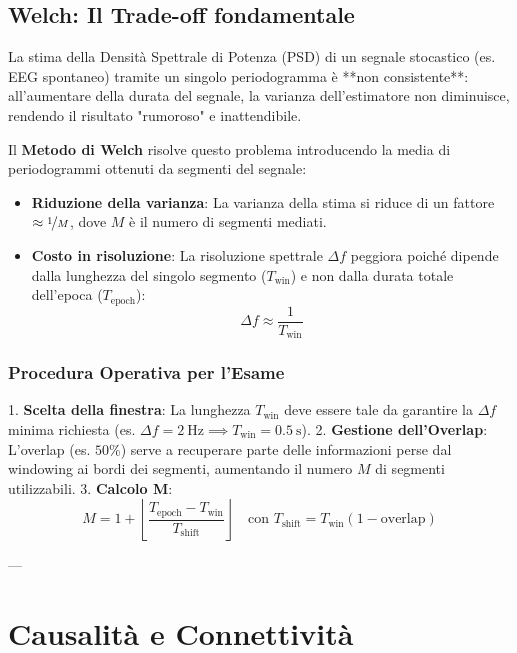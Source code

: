 \documentclass[10pt, letterpaper]{report}
\begin{document}
\section{Welch: Il Trade-off fondamentale}
La stima della Densità Spettrale di Potenza (PSD) di un segnale stocastico (es. EEG spontaneo) tramite un singolo periodogramma è **non consistente**: all'aumentare della durata del segnale, la varianza dell'estimatore non diminuisce, rendendo il risultato "rumoroso" e inattendibile.

Il \textbf{Metodo di Welch} risolve questo problema introducendo la media di periodogrammi ottenuti da segmenti del segnale:
\begin{itemize}
    \item \textbf{Riduzione della varianza}: La varianza della stima si riduce di un fattore $\approx \nicefrac{1}{M}$, dove $M$ è il numero di segmenti mediati.
    \item \textbf{Costo in risoluzione}: La risoluzione spettrale $\Delta f$ peggiora poiché dipende dalla lunghezza del singolo segmento ($T_{\text{win}}$) e non dalla durata totale dell'epoca ($T_{\text{epoch}}$):
    \[ \Delta f \approx \frac{1}{T_{\text{win}}} \]
\end{itemize}

\subsection{Procedura Operativa per l'Esame}
1. \textbf{Scelta della finestra}: La lunghezza $T_{\text{win}}$ deve essere tale da garantire la $\Delta f$ minima richiesta (es. $\Delta f = 2\ \text{Hz} \implies T_{\text{win}} = 0.5\ \text{s}$).
2. \textbf{Gestione dell'Overlap}: L'overlap (es. $50\%$) serve a recuperare parte delle informazioni perse dal windowing ai bordi dei segmenti, aumentando il numero $M$ di segmenti utilizzabili.
3. \textbf{Calcolo M}:
   \[ M = 1 + \left\lfloor \frac{T_{\text{epoch}} - T_{\text{win}}}{T_{\text{shift}}} \right\rfloor \quad \text{con } T_{\text{shift}} = T_{\text{win}}(1 - \text{overlap}) \]

---

\chapter{Causalità e Connettività}
\end{document}
